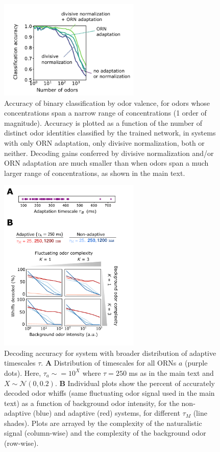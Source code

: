 \documentclass[9pt,twoside,lineno]{pnas-new}
\begin{document}
\begin{figure}
    \centering
    \includegraphics[width=0.6\textwidth]{figures/5_downstream_SI.pdf}
    \caption{Accuracy of binary classification  by odor valence, for odors whose concentrations span a narrow range of concentrations (1 order of magnitude). Accuracy is plotted as a function of the number of distinct odor identities classified by the trained network, in systems with only ORN adaptation, only divisive normalization, both or neither. Decoding gains conferred by divisive normalization and/or ORN adaptation are much smaller than when odors span a much larger range of concentrations, as shown in the main text.}
    \label{fig:SI_downstream}
\end{figure}



\begin{figure}
\centering
\includegraphics[width=0.6\textwidth]{figures/temporal_broad_tA.pdf}
\caption{Decoding accuracy for system with broader distribution of adaptive timescales $\tau$.
\textbf{A} Distribution of timescales for all ORNs $a$ (purple dots). Here, $\tau_a \sim = 10^X$ where $\tau = 250$ ms as in the main text and $X \sim \mathcal N(0, 0.2)$. 
\textbf{B}  Individual plots show the percent of accurately decoded odor whiffs (same fluctuating odor signal used in the main text) as a function of background odor intensity, for the non-adaptive (blue) and adaptive (red) systems, for different $\tau_M$ (line shades). Plots are arrayed by the complexity of the naturalistic signal (column-wise) and the complexity of the background odor (row-wise).
}
\label{fig:SI_broad_tA}
\end{figure}
\end{document}
